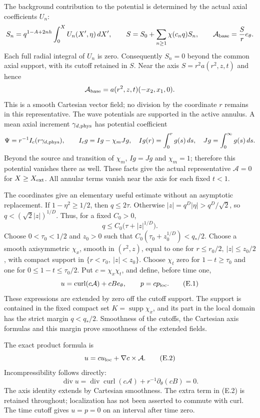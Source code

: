 \documentclass[10pt,a4paper]{article}
\begin{document}
The background contribution to the potential is determined by the actual
axial coefficients $U_n$:
\[
 S_n=q^{1-A+2nh}\int_0^XU_n(X',\eta)\,dX',\qquad
 S=S_0+\sum_{n\ge1}\chi(c_nq)S_n,\qquad
 \mathcal A_{\rm base}=\frac{S}{r}e_\theta.
\]
Each full radial integral of $U_n$ is zero. Consequently $S_n=0$
beyond the common axial support, with its cutoff retained in $S$.
Near the axis $S=r^2a(r^2,z,t)$ and hence
\[
 \mathcal A_{\rm base}=a(r^2,z,t)(-x_2,x_1,0).
\]
This is a smooth Cartesian vector field; no division by the coordinate
$r$ remains in this representative. The wave potentials are supported
in the active annulus. A mean axial increment $\gamma_{d,\rm phys}$
has potential coefficient
\[
 \Psi=r^{-1}I_c(r\gamma_{d,\rm phys}),\qquad
 I_cg=Ig-\chi_m Jg,\quad
 Ig(r)=\int_0^rg(s)\,ds,\quad Jg=\int_0^\infty g(s)\,ds.
\]
Beyond the source and transition of $\chi_m$, $Ig=Jg$ and $\chi_m=1$;
therefore this potential vanishes there as well. These facts give the
actual representative $\mathcal A=0$ for $X\ge X_{\rm ext}$.
All annular terms vanish near the axis for each fixed $t<1$.

The coordinates give an elementary useful estimate without an
asymptotic replacement. If $1-\eta^2\ge1/2$, then $q\le2\tau$.
Otherwise $|z|=q^D|\eta|>q^D/\sqrt2$, so
$q<(\sqrt2|z|)^{1/D}$. Thus, for a fixed $C_0>0$,
\[
 q\le C_0\big(\tau+|z|^{1/D}\big).
\]
Choose $0<\tau_0<1/2$ and $z_0>0$ such that
$C_0(\tau_0+z_0^{1/D})<q_*/2$. Choose a smooth axisymmetric
$\chi_x$, smooth in $(r^2,z)$, equal to one for
$r\le r_0/2,\ |z|\le z_0/2$, with compact support in
$\{r<r_0,\ |z|<z_0\}$. Choose $\chi_t$ zero for
$1-t\ge\tau_0$ and one for $0\le1-t\le\tau_0/2$.
Put $c=\chi_x\chi_t$, and define, before time one,
\[
 u=\operatorname{curl}(c\mathcal A)+cB e_\theta,\qquad p=cp_{\rm loc}.
 \tag{E.1}
\]
These expressions are extended by zero off the cutoff support. The
support is contained in the fixed compact set $K=\operatorname{supp}\chi_x$,
and its part in the local domain has the strict margin $q<q_*/2$.
Smoothness of the cutoffs, the Cartesian axis formulas and this margin
prove smoothness of the extended fields.

The exact product formula is
\[
 u=c u_{\rm loc}+\nabla c\times\mathcal A.
 \tag{E.2}
\]
Incompressibility follows directly:
\[
 \operatorname{div}u
 =\operatorname{div}\operatorname{curl}(c\mathcal A)
   +r^{-1}\partial_\theta(cB)=0.
\]
The axis identity extends by Cartesian smoothness. The extra term in
(E.2) is retained throughout; localization has not been asserted to
commute with curl. The time cutoff gives $u=p=0$ on an interval
after time zero.
\end{document}
